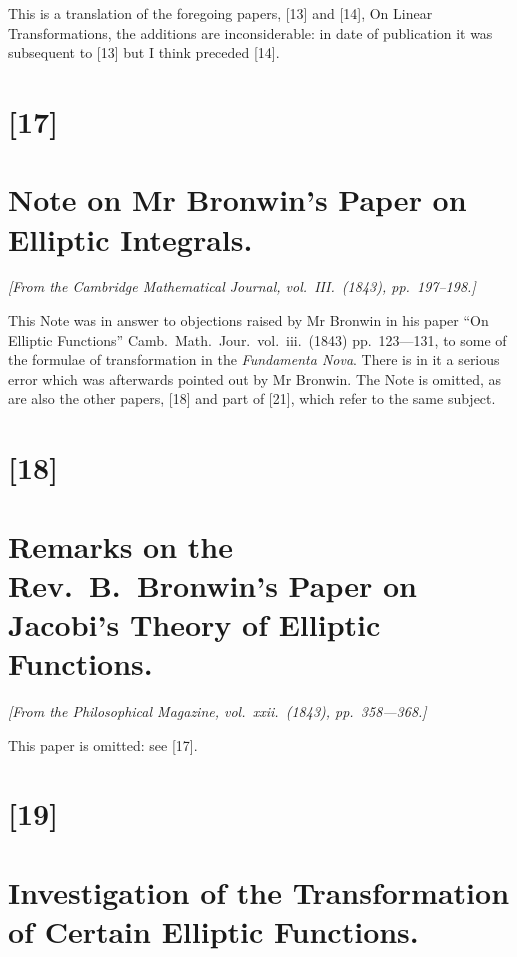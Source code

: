 \documentclass[11pt,a4paper]{book}
\begin{document}
\bigskip
\setcounter{page}{117}

This is a translation of the foregoing papers, [13] and [14], On Linear Transformations, the additions
are inconsiderable: in date of publication it was subsequent to [13] but I think preceded [14].

\newpage
\section*{[17]}
\section*{Note on Mr Bronwin's Paper on Elliptic Integrals.}

\textit{[From the Cambridge Mathematical Journal, vol.~III.~(1843), pp.~197--198.]}

\bigskip
\setcounter{page}{118}

This Note was in answer to objections raised by Mr Bronwin in his paper ``On Elliptic Functions''
Camb.\ Math.\ Jour.\ vol.~iii.\ (1843) pp.~123---131, to some of the formulae of transformation in the
\textit{Fundamenta Nova}. There is in it a serious error which was afterwards pointed out by Mr Bronwin.
The Note is omitted, as are also the other papers, [18] and part of [21], which refer to the same subject.

\newpage
\section*{[18]}
\section*{Remarks on the Rev.~B.~Bronwin's Paper on Jacobi's Theory of Elliptic Functions.}

\textit{[From the Philosophical Magazine, vol.~xxii.~(1843), pp.~358---368.]}

\bigskip
\setcounter{page}{119}

This paper is omitted: see [17].

\newpage
\section*{[19]}
\section*{Investigation of the Transformation of Certain Elliptic Functions.}
\end{document}
